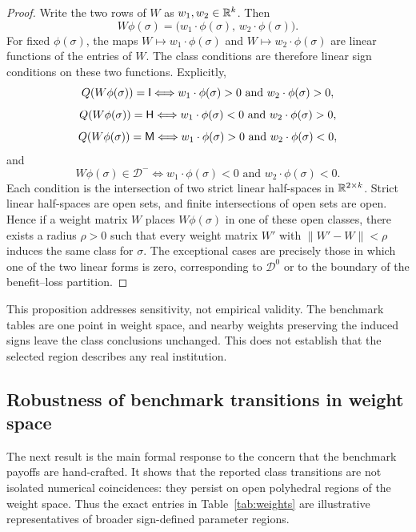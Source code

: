 \begin{proof}
Write the two rows of $W$ as $w_1,w_2\in\mathbb{R}^k$. Then
\[
W\phi(\sigma)=\bigl(w_1\cdot\phi(\sigma),\, w_2\cdot\phi(\sigma)\bigr).
\]
For fixed $\phi(\sigma)$, the maps $W\mapsto w_1\cdot\phi(\sigma)$ and $W\mapsto w_2\cdot\phi(\sigma)$ are linear functions of the entries of $W$. The class conditions are therefore linear sign conditions on these two functions. Explicitly,
\[
Q(W\phi(\sigma))=\mathsf{I} \Longleftrightarrow w_1\cdot\phi(\sigma)>0\text{ and }w_2\cdot\phi(\sigma)>0,
\]
\[
Q(W\phi(\sigma))=\mathsf{H} \Longleftrightarrow w_1\cdot\phi(\sigma)<0\text{ and }w_2\cdot\phi(\sigma)>0,
\]
\[
Q(W\phi(\sigma))=\mathsf{M} \Longleftrightarrow w_1\cdot\phi(\sigma)>0\text{ and }w_2\cdot\phi(\sigma)<0,
\]
and
\[
W\phi(\sigma)\in\mathcal D^- \Longleftrightarrow w_1\cdot\phi(\sigma)<0\text{ and }w_2\cdot\phi(\sigma)<0.
\]
Each condition is the intersection of two strict linear half-spaces in $\mathbb{R}^{2\times k}$. Strict linear half-spaces are open sets, and finite intersections of open sets are open. Hence if a weight matrix $W$ places $W\phi(\sigma)$ in one of these open classes, there exists a radius $\rho>0$ such that every weight matrix $W'$ with $\|W'-W\|<\rho$ induces the same class for $\sigma$. The exceptional cases are precisely those in which one of the two linear forms is zero, corresponding to $\mathcal D^0$ or to the boundary of the benefit--loss partition.
\end{proof}

This proposition addresses sensitivity, not empirical validity. The benchmark tables are one point in weight space, and nearby weights preserving the induced signs leave the class conclusions unchanged. This does not establish that the selected region describes any real institution.

\subsection{Robustness of benchmark transitions in weight space}

The next result is the main formal response to the concern that the benchmark payoffs are hand-crafted. It shows that the reported class transitions are not isolated numerical coincidences: they persist on open polyhedral regions of the weight space. Thus the exact entries in Table~\ref{tab:weights} are illustrative representatives of broader sign-defined parameter regions.

